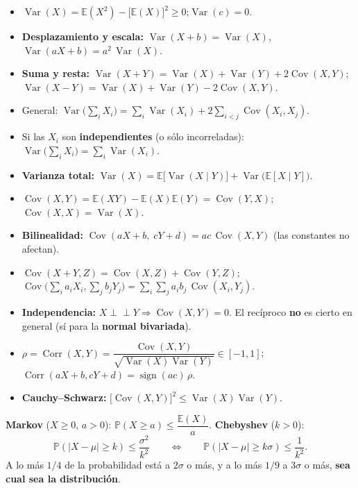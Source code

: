 \documentclass[10pt,a4paper]{article}
\newcommand{\E}{\mathbb{E}}
\newcommand{\Prob}{\mathbb{P}}
\newcommand{\Var}{\operatorname{Var}}
\newcommand{\Cov}{\operatorname{Cov}}
\newcommand{\Corr}{\operatorname{Corr}}
\newcommand{\ind}{\perp\!\!\!\perp}
\begin{document}
\begin{thmbox}[frametitle={Propiedades de la varianza}]
\begin{itemize}
  \item $\Var(X)=\E(X^2)-\big[\E(X)\big]^2\ge 0$;\quad $\Var(c)=0$.
  \item \textbf{Desplazamiento y escala:} $\Var(X+b)=\Var(X)$,\quad
        $\Var(aX+b)=a^2\,\Var(X)$.
  \item \textbf{Suma y resta:}
        $\Var(X+Y)=\Var(X)+\Var(Y)+2\Cov(X,Y)$;\quad
        $\Var(X-Y)=\Var(X)+\Var(Y)-2\Cov(X,Y)$.
  \item General: $\Var\!\big(\sum_i X_i\big)=\sum_i\Var(X_i)
        +2\sum_{i<j}\Cov(X_i,X_j)$.
  \item Si las $X_i$ son \textbf{independientes} (o sólo incorreladas):
        $\Var\!\big(\sum_i X_i\big)=\sum_i\Var(X_i)$.
  \item \textbf{Varianza total:}
        $\Var(X)=\E\big[\Var(X\mid Y)\big]+\Var\big(\E[X\mid Y]\big)$.
\end{itemize}
\end{thmbox}

\begin{thmbox}[frametitle={Propiedades de la covarianza y correlación}]
\begin{itemize}
  \item $\Cov(X,Y)=\E(XY)-\E(X)\E(Y)=\Cov(Y,X)$;\quad $\Cov(X,X)=\Var(X)$.
  \item \textbf{Bilinealidad:}
        $\Cov(aX+b,\;cY+d)=ac\,\Cov(X,Y)$ (las constantes no afectan).
  \item $\Cov(X+Y,Z)=\Cov(X,Z)+\Cov(Y,Z)$;\quad
        $\Cov\!\big(\sum_i a_iX_i,\sum_j b_jY_j\big)=\sum_{i}\sum_{j}a_i b_j\,\Cov(X_i,Y_j)$.
  \item \textbf{Independencia:} $X\ind Y\Rightarrow \Cov(X,Y)=0$. El recíproco
        \textbf{no} es cierto en general (sí para la \textbf{normal bivariada}).
  \item $\rho=\Corr(X,Y)=\dfrac{\Cov(X,Y)}{\sqrt{\Var(X)\Var(Y)}}\in[-1,1]$;\quad
        $\Corr(aX+b,cY+d)=\operatorname{sign}(ac)\,\rho$.
  \item \textbf{Cauchy–Schwarz:} $\big[\Cov(X,Y)\big]^2\le\Var(X)\Var(Y)$.
\end{itemize}
\end{thmbox}

\begin{thmbox}[frametitle={Desigualdades}]
\textbf{Markov} ($X\ge0$, $a>0$): $\Prob(X\ge a)\le\dfrac{\E(X)}{a}$.\qquad
\textbf{Chebyshev} ($k>0$):
\[
\Prob(|X-\mu|\ge k)\le\frac{\sigma^2}{k^2}
\qquad\Longleftrightarrow\qquad
\Prob(|X-\mu|\ge k\sigma)\le\frac{1}{k^2}.
\]
A lo más $1/4$ de la probabilidad está a $2\sigma$ o más, y a lo más $1/9$ a
$3\sigma$ o más, \textbf{sea cual sea la distribución}.
\end{thmbox}
\end{document}
